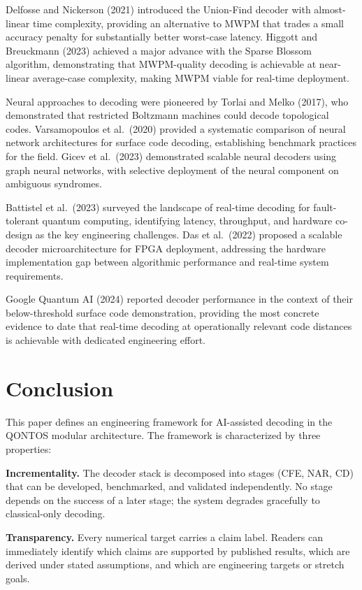 \documentclass[conference]{IEEEtran}
\begin{document}
Delfosse and Nickerson (2021) introduced the Union-Find decoder with almost-linear time complexity, providing an alternative to MWPM that trades a small accuracy penalty for substantially better worst-case latency. Higgott and Breuckmann (2023) achieved a major advance with the Sparse Blossom algorithm, demonstrating that MWPM-quality decoding is achievable at near-linear average-case complexity, making MWPM viable for real-time deployment.

Neural approaches to decoding were pioneered by Torlai and Melko (2017), who demonstrated that restricted Boltzmann machines could decode topological codes. Varsamopoulos et al.\ (2020) provided a systematic comparison of neural network architectures for surface code decoding, establishing benchmark practices for the field. Gicev et al.\ (2023) demonstrated scalable neural decoders using graph neural networks, with selective deployment of the neural component on ambiguous syndromes.

Battistel et al.\ (2023) surveyed the landscape of real-time decoding for fault-tolerant quantum computing, identifying latency, throughput, and hardware co-design as the key engineering challenges. Das et al.\ (2022) proposed a scalable decoder microarchitecture for FPGA deployment, addressing the hardware implementation gap between algorithmic performance and real-time system requirements.

Google Quantum AI (2024) reported decoder performance in the context of their below-threshold surface code demonstration, providing the most concrete evidence to date that real-time decoding at operationally relevant code distances is achievable with dedicated engineering effort.

\section{Conclusion}

This paper defines an engineering framework for AI-assisted decoding in the QONTOS modular architecture. The framework is characterized by three properties:

\textbf{Incrementality.} The decoder stack is decomposed into stages (CFE, NAR, CD) that can be developed, benchmarked, and validated independently. No stage depends on the success of a later stage; the system degrades gracefully to classical-only decoding.

\textbf{Transparency.} Every numerical target carries a claim label. Readers can immediately identify which claims are supported by published results, which are derived under stated assumptions, and which are engineering targets or stretch goals.
\end{document}
